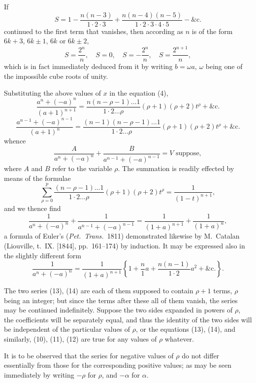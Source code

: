 \documentclass[12pt,a4paper]{article}
\theoremstyle{plain}
\theoremstyle{definition}
\begin{document}
If
\[
S = 1 - \frac{n(n - 3)}{1 \cdot 2\cdot 3} + \frac{n(n - 4)(n - 5)}{1 \cdot 2 \cdot 3 \cdot 4 \cdot 5} - \&\text{c.} \tag{8}
\]
continued to the first term that vanishes, then according as $n$ is of the form $6k + 3$, $6k \pm 1$, $6k$ or $6k \pm 2$,
\[
S = \frac{2^n}{n}, \quad S = 0, \quad S = -\frac{2^n}{n}, \quad S = \frac{2^{n+1}}{n}, \tag{9}
\]
which is in fact immediately deduced from it by writing $b = \omega a$, $\omega$ being one of the impossible cube roots of unity.

Substituting the above values of $x$ in the equation (4),
\[
\frac{a^n + (-a)^n}{(a + 1)^{n+1}} = \frac{n(n - \rho - 1)\ldots 1}{1 \cdot 2 \ldots \rho}(\rho + 1)(\rho + 2)t^\rho + \&\text{c.} \tag{10}
\]
\[
\frac{a^{n-1} + (-a)^{n-1}}{(a + 1)^n} = \frac{(n - 1)(n - \rho - 1)\ldots 1}{1 \cdot 2 \ldots \rho}(\rho + 1)(\rho + 2)t^\rho + \&\text{c.} \tag{11}
\]
whence
\[
\frac{A}{a^n + (-a)^n} + \frac{B}{a^{n-1} + (-a)^{n-1}} = V \text{ suppose}, \tag{12}
\]
where $A$ and $B$ refer to the variable $\rho$. The summation is readily effected by means of the formulae
\[
\sum_{\rho = 0}^{p} \frac{(n - \rho - 1)\ldots 1}{1 \cdot 2 \ldots \rho}(\rho + 1)(\rho + 2)t^\rho = \frac{1}{(1 - t)^{n+1}},
\]
and we thence find
\[
\frac{1}{a^n + (-a)^n} + \frac{1}{a^{n-1} + (-a)^{n-1}} = \frac{1}{(1 + a)^{n+1}} + \frac{1}{(1 + a)^n}, \tag{13}
\]
a formula of Euler's (\textit{Pet.\ Trans.}\ 1811) demonstrated likewise by M.\ Catalan (Liouville, t.~IX. [1844], pp.~161--174) by induction. It may be expressed also in the slightly different form
\[
\frac{1}{a^n + (-a)^n} = \frac{1}{(1 + a)^{n+1}}\left\{1 + \frac{n}{1}a + \frac{n(n - 1)}{1 \cdot 2}a^2 + \&\text{c.}\right\}. \tag{14}
\]

The two series (13), (14) are each of them supposed to contain $\rho + 1$ terms, $\rho$ being an integer; but since the terms after these all of them vanish, the series may be continued indefinitely. Suppose the two sides expanded in powers of $\rho$, the coefficients will be separately equal, and thus the identity of the two sides will be independent of the particular values of $\rho$, or the equations (13), (14), and similarly, (10), (11), (12) are true for any values of $\rho$ whatever.

It is to be observed that the series for negative values of $\rho$ do not differ essentially from those for the corresponding positive values; as may be seen immediately by writing $-\rho$ for $\rho$, and $-\alpha$ for $\alpha$.

\newpage
[187]
\end{document}
